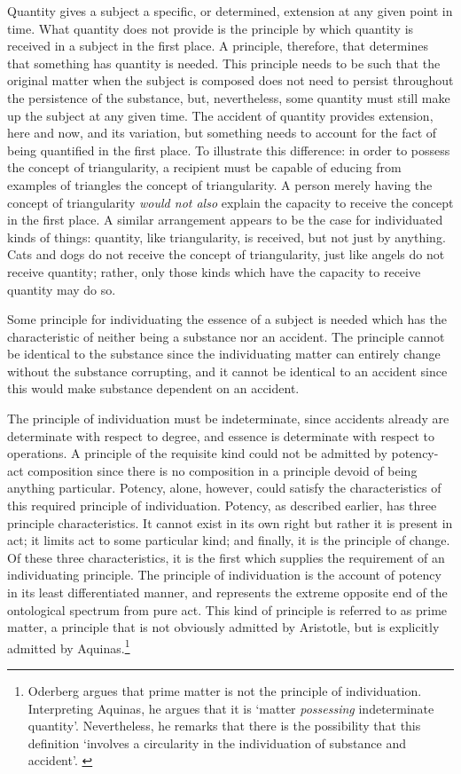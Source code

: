 Quantity gives a subject a specific, or determined, extension at any given point in time. What quantity does not provide is the principle by which quantity is received in a subject in the first place. A principle, therefore, that determines that something has quantity is needed. This principle needs to be such that the original matter when the subject is composed does not need to persist throughout the persistence of the substance, but, nevertheless, some quantity must still make up the subject at any given time. The accident of quantity provides extension, here and now, and its variation, but something needs to account for the fact of being quantified in the first place. To illustrate this difference: in order to possess the concept of triangularity, a recipient must be capable of educing from examples of triangles the concept of triangularity. A person merely having the concept of triangularity \emph{would not also} explain the capacity to receive the concept in the first place. A similar arrangement appears to be the case for individuated kinds of things: quantity, like triangularity, is received, but not just by anything. Cats and dogs do not receive the concept of triangularity, just like angels do not receive quantity; rather, only those kinds which have the capacity to receive quantity may do so.


Some principle for individuating the essence of a subject is needed which has the characteristic of neither being a substance nor an accident. The principle cannot be identical to the substance since the individuating matter can entirely change without the substance corrupting, and it cannot be identical to an accident since this would make substance dependent on an accident.

The principle of individuation must be indeterminate, since accidents already are determinate with respect to degree, and essence is determinate with respect to operations. A principle of the requisite kind could not be admitted by potency-act composition since there is no composition in a principle devoid of being anything particular.
Potency, alone, however, could satisfy the characteristics of this required principle of individuation.
Potency, as described earlier, has three principle characteristics. It cannot exist in its own right but rather it is present in act; it limits act to some particular kind; and finally, it is the principle of change.
Of these three characteristics, it is the first which supplies the requirement of an individuating principle. The principle of individuation is the account of potency in its least differentiated manner, and represents the extreme opposite end of the ontological spectrum from pure act.
This kind of principle is referred to as prime matter, a principle that is not obviously admitted by Aristotle, but is explicitly admitted by Aquinas.\footnote{Oderberg argues that prime matter is not the principle of individuation. Interpreting Aquinas, he argues that it is `matter \emph{possessing} indeterminate quantity'. Nevertheless, he remarks that there is the possibility that this definition `involves a circularity in the individuation of substance and accident'. \parencite[][]{Oderberg2002Individuation}}

